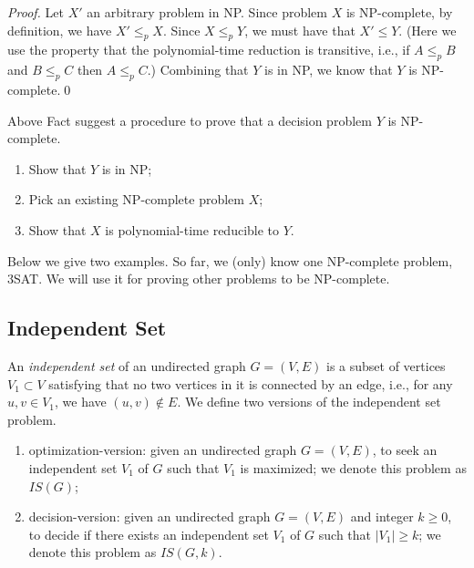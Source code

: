 \emph{Proof.} Let $X'$ an arbitrary problem in NP. Since problem $X$ is NP-complete,
by definition, we have $X' \le_p X$. Since $X\le_p Y$, we must have that $X'\le Y$.
(Here we use the property that the polynomial-time reduction is transitive, i.e.,
 if $A\le_p B$ and $B\le_p C$ then $A\le_p C$.)
Combining that $Y$ is in NP, we know that $Y$ is NP-complete.\qed

Above Fact suggest a procedure to prove that a decision problem $Y$ is NP-complete.
\begin{enumerate}
\item Show that $Y$ is in NP;
\item Pick an existing NP-complete problem $X$;
\item Show that $X$ is polynomial-time reducible to $Y$. 
\end{enumerate}

Below we give two examples. So far, we (only) know one NP-complete
problem, 3SAT. We will use it for proving other problems to be NP-complete.


\subsection*{Independent Set}

An \emph{independent set} of an undirected graph $G = (V, E)$
is a subset of vertices $V_1\subset V$ satisfying that no two vertices in it is connected by an edge, i.e.,
for any $u,v\in V_1$, we have $(u,v)\not\in E$. We define two versions of the independent set problem.
\begin{enumerate}
\item optimization-version: given an undirected graph $G = (V, E)$, to seek an independent set $V_1$ of $G$ such that $V_1$ is maximized; we denote this problem as $IS(G)$;
\item decision-version: given an undirected graph $G = (V, E)$ and integer $k\ge 0$, to decide if there exists an independent set $V_1$ of $G$ such that $|V_1| \ge k$;
we denote this problem as $IS(G,k)$.
\end{enumerate}

